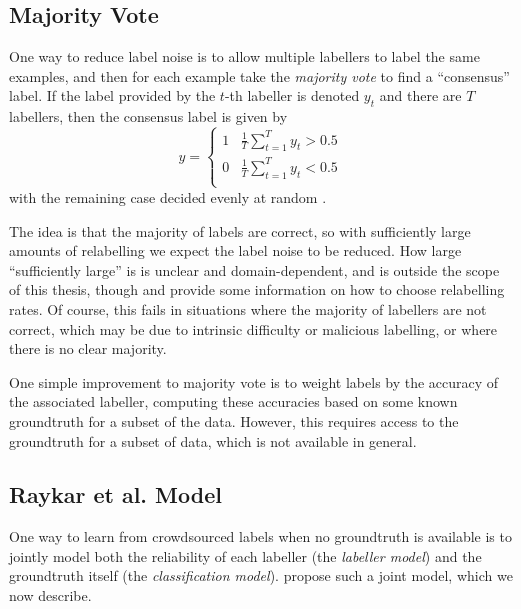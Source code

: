     \subsection{Majority Vote}
    \label{sec:majority-vote}

        One way to reduce label noise is to allow multiple labellers to label
        the same examples, and then for each example take the \emph{majority
        vote} to find a ``consensus'' label. If the label provided by the $t$-th
        labeller is denoted $y_t$ and there are $T$ labellers, then the
        consensus label is given by
        \begin{equation*}
            y = \begin{cases}
                1 & \frac{1}{T} \sum_{t = 1}^T y_t > 0.5\\
                0 & \frac{1}{T} \sum_{t = 1}^T y_t < 0.5\\
            \end{cases}
        \end{equation*}
        with the remaining case decided evenly at random \citep{raykar10}.

        The idea is that the majority of labels are correct, so with
        sufficiently large amounts of relabelling we expect the label noise to
        be reduced. How large ``sufficiently large'' is is unclear and
        domain-dependent, and is outside the scope of this thesis, though
        \citet{sheng08} and \citet{lin16} provide some information on how to
        choose relabelling rates. Of course, this fails in situations where the
        majority of labellers are not correct, which may be due to intrinsic
        difficulty or malicious labelling, or where there is no clear majority.

        One simple improvement to majority vote is to weight labels by the
        accuracy of the associated labeller, computing these accuracies based on
        some known groundtruth for a subset of the data. However, this requires
        access to the groundtruth for a subset of data, which is not available
        in general.

    \subsection{Raykar et al. Model}
    \label{sec:raykar}

        One way to learn from crowdsourced labels when no groundtruth is
        available is to jointly model both the reliability of each labeller (the
        \emph{labeller model}) and the groundtruth itself (the
        \emph{classification model}). \citet{raykar10} propose such a joint
        model, which we now describe.

